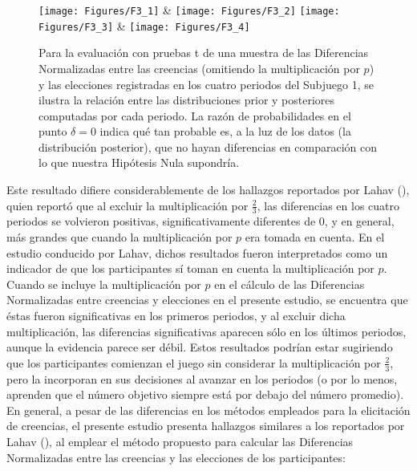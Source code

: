 \begin{figure}[hp]
\centering
\texttt{[image: Figures/F3\_1]} & \texttt{[image: Figures/F3\_2]} 
\texttt{[image: Figures/F3\_3]} & \texttt{[image: Figures/F3\_4]} 
\decoRule
\caption[Diferencias Normalizadas entre creencias y elecciones en el Subjuegoo 1, omitiendo la multiplicación por $p$ (Factor de Bayes)]{Para la evaluación con pruebas t de una muestra de las Diferencias Normalizadas entre las creencias (omitiendo la multiplicación por $p$) y las elecciones registradas en los cuatro periodos del Subjuego 1, se ilustra la relación entre las distribuciones prior y posteriores computadas por cada periodo. La razón de probabilidades en el punto $\delta = 0$ indica qué tan probable es, a la luz de los datos (la distribución posterior), que no hayan diferencias en comparación con lo que nuestra Hipótesis Nula supondría.}
\label{fig:DNnop_S1}
\end{figure}

Este resultado difiere considerablemente de los hallazgos reportados por Lahav (\citeyear{Lahav}), quien reportó que al excluir la multiplicación por $\frac{2}{3}$, las diferencias en los cuatro periodos se volvieron positivas, significativamente diferentes de 0, y en general, más grandes que cuando la multiplicación por $p$ era tomada en cuenta. En el estudio conducido por Lahav, dichos resultados fueron interpretados como un indicador de que los participantes sí toman en cuenta la multiplicación por $p$.\\

Cuando se incluye la multiplicación por $p$ en el cálculo de las Diferencias Normalizadas entre creencias y elecciones en el presente estudio, se encuentra que éstas fueron significativas en los primeros periodos, y al excluir dicha multiplicación, las diferencias significativas aparecen sólo en los últimos periodos, aunque la evidencia parece ser débil. Estos resultados podrían estar sugiriendo que los participantes comienzan el juego sin considerar la multiplicación por $\frac{2}{3}$, pero la incorporan en sus decisiones al avanzar en los periodos (o por lo menos, aprenden que el número objetivo siempre está por debajo del número promedio).\\

En general, a pesar de las diferencias en los métodos empleados para la elicitación de creencias, el presente estudio presenta hallazgos similares a los reportados por Lahav (\citeyear{Lahav}), al emplear el método propuesto para calcular las Diferencias Normalizadas entre las creencias y las elecciones de los participantes:\\

